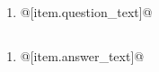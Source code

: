 \documentclass[uplatex,a4j,11pt]{jsarticle}
\begin{document}
\section{}
\begin{multicols}{2}
\begin{enumerate}
    \item @[item.question\_text]@
\end{enumerate}
\end{multicols}
\newpage

\begin{multicols}{2}
\section{}
\begin{enumerate}
  \item @[item.answer\_text]@
\end{enumerate}
\newpage
\end{multicols}
\end{document}
